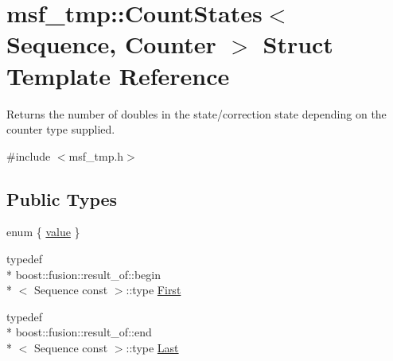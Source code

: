 \hypertarget{structmsf__tmp_1_1CountStates}{\section{msf\-\_\-tmp\-:\-:Count\-States$<$ Sequence, Counter $>$ Struct Template Reference}
\label{structmsf__tmp_1_1CountStates}
}


Returns the number of doubles in the state/correction state depending on the counter type supplied.  




{\ttfamily \#include $<$msf\-\_\-tmp.\-h$>$}

\subsection*{Public Types}
\begin{DoxyCompactItemize}
\item 
enum \{ \hyperlink{structmsf__tmp_1_1CountStates_ae1fe3e11efda2e207cd42f8bf7c2eba2a26821d1f33c34725492149ef021699c9}{value}
 \}
\item 
typedef \\*
boost\-::fusion\-::result\-\_\-of\-::begin\\*
$<$ Sequence const  $>$\-::type \hyperlink{structmsf__tmp_1_1CountStates_acbf60b9f084215f06ff6be0777f28714}{First}
\item 
typedef \\*
boost\-::fusion\-::result\-\_\-of\-::end\\*
$<$ Sequence const  $>$\-::type \hyperlink{structmsf__tmp_1_1CountStates_aacfada144f8987a32c5be3a01c9d99c0}{Last}
\end{DoxyCompactItemize}


